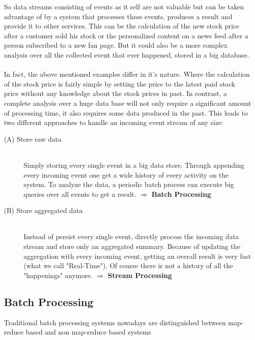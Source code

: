 So data streams consisting of events as it self are not valuable but
can be taken advantage of by a system that processes these events, produces a
result and provide it to other services. This can be the calculation of the new
stock price after a customer sold his stock or the personalized content on a
news feed after a person subscribed to a new fan page. But it could also be a
more complex analysis over all the collected event that ever happened, stored in
a big database. 
\\ \\
In fact, the above mentioned examples differ in it's nature. Where the
calculation of the stock price is fairly simple by setting the price to the
latest paid stock price without any knowledge about the stock prices in past. 
In contrast, a complete analysis over a huge data base will not only require a
significant amount of processing time, it also requires some data produced in the
past. This leads to two different approaches to handle an incoming event stream
of any size: 

\begin{description}
    \item[(A) Store raw data]  \hfill \\
    {Simply storing every single event in a big data store. Through appending
    every incoming event one get a wide history of every activity on the system.
    To analyze the data, a periodic batch process can execute big queries over
    all events to get a result.  $ \Rightarrow $  \textbf{Batch Processing}}
    \item[(B) Store aggregated data  ] \hfill \\
    {Instead of persist every single event, directly process the incoming data stream and store
    only an aggregated summary. Because of updating the aggregation with every
    incoming event, getting an overall result is very fast (what we call
    "Real-Time"). Of course there is not a history of all the "happenings"
    anymore. $ \Rightarrow $ \textbf{Stream Processing}} 
\end{description}
\cite{TalkKleppmann}


\subsection{Batch Processing}
\label{intro-datastream-batchprocessing}
Traditional batch processing systems nowadays are distinguished between
map-reduce based and non map-reduce based systems 

